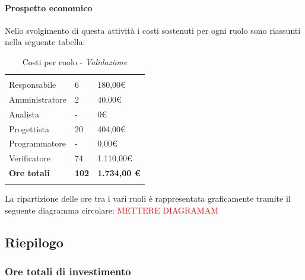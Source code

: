 			\paragraph{Prospetto economico}	\Spazio
			Nello svolgimento di questa attività i costi sostenuti per ogni ruolo sono riassunti nella seguente tabella:
			\begin{table}[H]
				\centering
				\begin{tabular}{|p{4cm}|C{4cm}|C{4cm}|}
					
					 & &\\
					Responsabile & 6 & 180,00\euro \\
					\hline
					Amministratore& 2 & 40,00\euro \\
					\hline
					Analista & - & 0\euro \\
					\hline
					Progettista & 20 & 404,00\euro \\
					\hline
					Programmatore & - & 0,00\euro \\
					\hline
					Verificatore & 74 & 1.110,00\euro \\
					\hline
					\textbf{Ore totali} & \textbf{102} & \textbf{1.734,00 \euro} \\
				\end{tabular}
				\caption{Costi per ruolo - \textit{Validazione}}
			\end{table}
			
			La ripartizione delle ore tra i vari ruoli è rappresentata graficamente tramite il seguente diagramma circolare:
			\textcolor{red}{METTERE DIAGRAMAM}		
				
				
								
	\subsection{Riepilogo}
		\subsubsection{Ore totali di investimento}
